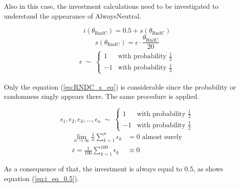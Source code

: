 \documentclass[11pt]{article}
\begin{document}
	Also in this case, the investment calculations need to be investigated to understand the appearance of AlwaysNeutral.

	\begin{equation}
		i(\theta_{\mathrm{RndC}}) = 0.5 + s(\theta_{\mathrm{RndC}})
		\label{eq:RNDC_i_eq}
	\end{equation}
	\begin{equation}
		s(\theta_{\mathrm{RndC}}) = \epsilon \cdot \frac{\theta_{\mathrm{RndC}}}{20}
		\label{eq:RNDC_s_eq}
	\end{equation}
	\begin{equation}
		\begin{split}
		\epsilon \;\sim\;
		\begin{cases}
		  1 & \text{with probability } \frac{1}{2}\\
		 -1 & \text{with probability } \frac{1}{2} 
		\end{cases}
		\label{eq:prob_eps}
		\end{split}
	\end{equation}

	Only the equation (\ref{eq:RNDC_s_eq}) is considerable since the probability or randomness singly appears there.
	The same procedure is applied.

	\begin{equation}
		\epsilon_1, \epsilon_2, \epsilon_3, \dots, \epsilon_n \;\sim\; 
		\begin{cases}
		  1 & \text{with probability } \frac{1}{2}\\
		 -1 & \text{with probability } \frac{1}{2} 
		\end{cases}
		\label{eq:RNDC_n_i}
	\end{equation}
	\begin{equation}
		\begin{split}
			\lim_{n\to\infty} \frac{1}{n} \sum_{k=1}^{n} \epsilon_k &= 0 \text{ almost surely}\\
			\bar \epsilon = \frac{1}{100} \sum_{k=1}^{100} \epsilon_k &\approx 0
		\label{eq:RNDC_approx_eq}
		\end{split}
	\end{equation}

	As a consequence of that, the investment is always equal to 0.5, as shows equation (\ref{eq:i_eq_0.5}).
\end{document}
